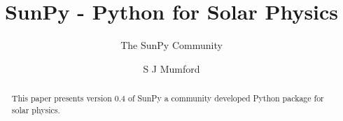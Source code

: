 \documentclass[12pt]{iopart}
\begin{document}
\title{SunPy - Python for Solar Physics}

\author{The SunPy Community}
\address{\url{http://sunpy.org}}

\author{S J Mumford}
\address{Solar Physics \& Space Plasma Research Centre (SP$^{2}$RC), School of 
Mathematics and Statistics, The University of Sheffield, Hicks Building, 
Hounsfield Road, Sheffield, S3 7RH U.K.}

\begin{abstract}
This paper presents version 0.4 of SunPy a community developed Python package 
for solar physics.

\end{abstract}

\maketitle


\label{sec:Intro}


\label{sec:DataTypes}


\label{sec:retrevial}


\label{sec:util}


\label{sec:dev}


\label{sec:future}

{}
\end{document}
